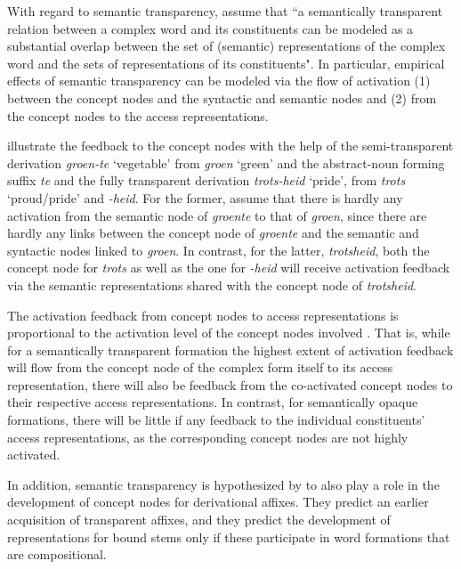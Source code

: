 With regard to semantic transparency, \citet[140]{SchreuderandBaayen:1995} assume that ``a
semantically transparent relation between a complex word and its
constituents can be modeled as a substantial overlap between the set
of (semantic) representations of the complex word and the sets of
representations of its constituents".  In particular, empirical
effects of semantic transparency can be modeled via the flow of
activation (1)  between the concept nodes and the syntactic and
semantic nodes and (2) from the concept nodes to the access representations.

\citeauthor{SchreuderandBaayen:1995} illustrate the feedback to the concept
nodes with the help of the semi-transparent derivation \emph{groen-te} 
`vegetable' from \emph{groen} `green' and the abstract-noun forming
suffix \emph{te} and the fully transparent derivation \emph{trots-heid}
`pride', from \emph{trots} `proud/pride' and \emph{-heid}. For the
former, \citet[142]{SchreuderandBaayen:1995} assume that there is
hardly any activation from the semantic node of \emph{groente} to that
of \emph{groen}, since there are hardly any links between the concept
node of \emph{groente} and the semantic and syntactic nodes linked to
\emph{groen}. In contrast, for the latter, \emph{trotsheid}, both the concept node for
\emph{trots} as well as the one for \emph{-heid} will receive
activation feedback via the semantic representations shared with the
concept node of \emph{trotsheid}.  

The activation feedback from concept nodes to access representations is
proportional to the activation level of the concept nodes involved
\citep[142]{SchreuderandBaayen:1995}. That is, while for a
semantically transparent formation the highest extent of activation
feedback will flow from the concept node of the complex form itself to
its access representation, there will also be feedback from the
co-activated concept nodes to their respective access
representations. In contrast, for semantically opaque formations,
there will be little if any feedback to the individual constituents'
access representations, as the corresponding concept nodes are not
highly activated.

In addition, semantic transparency 
is hypothesized by \citet[146]{SchreuderandBaayen:1995} to also play a
role in the development of concept nodes for derivational
affixes. They predict an
earlier acquisition of transparent affixes, and they predict
the development of representations for bound stems only if these
participate in word formations that are compositional. %

